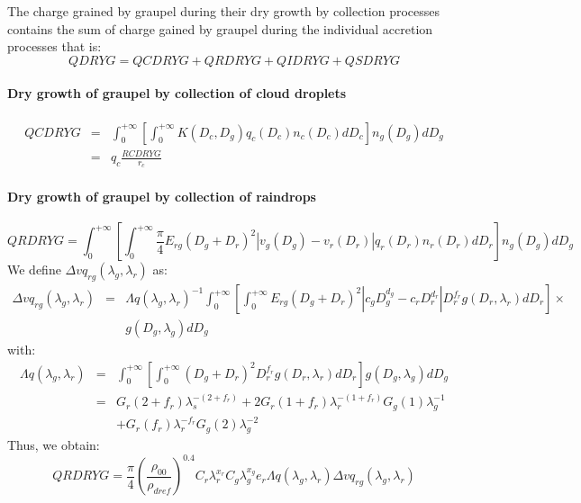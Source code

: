 The charge grained by graupel during their dry growth by collection processes contains the sum of charge gained by graupel during the individual accretion processes that is:
\begin{equation}
  QDRYG = QCDRYG + QRDRYG + QIDRYG + QSDRYG
\end{equation}

\paragraph{Dry growth of graupel by collection of cloud droplets}

\begin{eqnarray}
  QCDRYG &=& \int_0 ^{+ \infty} \left[ \int_0 ^{+ \infty}
             K(D_c , D_g) q_c (D_c) n_c (D_c) dD_c \right]
             n_g (D_g) dD_g \nonumber \\
         &=& q_c \frac{RCDRYG}{r_c}
\end{eqnarray}


\paragraph{Dry growth of graupel by collection of raindrops}

\begin{equation}
  QRDRYG = \int_0 ^{+ \infty} \left[ \int_0 ^{+ \infty} 
                  \frac{\pi}{4} E_{rg} (D_g + D_r)^2 |v_g (D_g) - v_r (D_r)|
                  q_r (D_r) n_r (D_r) dD_r \right] n_g (D_g) dD_g \nonumber
\end{equation}
We define $\Delta vq_{rg} (\lambda _g, \lambda _r)$ as:
\begin{eqnarray}
  \Delta vq_{rg} (\lambda _g, \lambda _r) & = & 
  \Lambda q(\lambda _g, \lambda _r)^{-1}  \int_0 ^{+ \infty} \left[ 
    \int_0 ^{+ \infty} E_{rg} (D_g + D_r)^2
    |c_g D_g ^{d_g} - c_r D_r ^{d_r}| D_r ^{f_r} g(D_r , \lambda_r) dD_r
    \right] \times \nonumber \\
    & & g(D_g , \lambda_g) dD_g
\end{eqnarray}
with:
\begin{eqnarray}
  \Lambda q(\lambda _g, \lambda _r) &=& \int_0 ^{+ \infty} \left[ 
    \int_0 ^{+ \infty} (D_g + D_r)^2 D_r ^{f_r} g(D_r , \lambda_r) dD_r
    \right] g(D_g , \lambda_g) dD_g \nonumber \\
   &=& G_r (2 + f_r) \lambda _s ^{-(2+f_r)} + 
       2 G_r (1 + f_r) \lambda _r ^{-(1+f_r)} G_g (1) \lambda _g ^{-1} \nonumber \\
   & & + G_r (f_r) \lambda _r ^{-f_r} G_g (2) \lambda _g ^{-2}
\end{eqnarray}
Thus, we obtain:
\begin{equation}
  QRDRYG = \frac{\pi}{4}
                  \left( \frac{\rho _{00}}{\rho _{dref}} \right)^{0.4}
                  C_r \lambda _r ^{x_r} C_g \lambda _g ^{x_g} e_r
                  \Lambda q(\lambda _g, \lambda _r)
                  \Delta vq_{rg} (\lambda _g, \lambda _r)
\end{equation}


